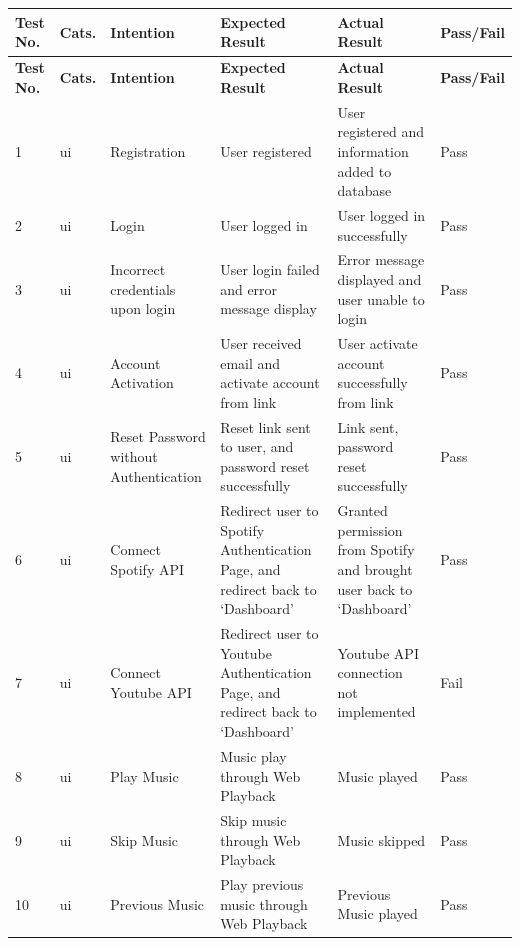 \newpage
\begin{landscape}
\section{}
\label{app:appendix-c}
\begin{longtable}{ |m{1cm}|m{1.5cm}|m{5cm}|m{6cm}|m{6cm}|m{2cm}| }
    \hline
    \rowcolor{lightgray}
    \textbf{Test No.} & \textbf{Cats.} & \textbf{Intention} & \textbf{Expected Result} & \textbf{Actual Result} & \textbf{Pass/Fail} \\
    \hline
    \endfirsthead

    \hline
    \rowcolor{lightgray}
    \textbf{Test No.} & \textbf{Cats.} & \textbf{Intention} & \textbf{Expected Result} & \textbf{Actual Result} & \textbf{Pass/Fail} \\
    \hline
    \endhead
    1 & \gls{ui} & Registration & User registered & User registered and information added to database & Pass \\
    \hline
    2 & \gls{ui} & Login & User logged in & User logged in successfully & Pass \\
    \hline
    3 & \gls{ui} & Incorrect credentials upon login & User login failed and error message display & Error message displayed and user unable to login & Pass \\
    \hline
    4 & \gls{ui} & Account Activation & User received email and activate account from link & User activate account successfully from link & Pass \\
    \hline
    5 & \gls{ui} & Reset Password without Authentication & Reset link sent to user, and password reset successfully & Link sent, password reset successfully & Pass \\
    \hline
    6 & \gls{ui} & Connect Spotify API & Redirect user to Spotify Authentication Page, and redirect back to `Dashboard' & Granted permission from Spotify and brought user back to `Dashboard' & Pass \\
    \hline
    7 & \gls{ui} & Connect Youtube API & Redirect user to Youtube Authentication Page, and redirect back to `Dashboard' & Youtube API connection not implemented & Fail \\
    \hline
    8 & \gls{ui} & Play Music & Music play through Web Playback & Music played & Pass \\
    \hline
    9 & \gls{ui} & Skip Music & Skip music through Web Playback & Music skipped & Pass \\
    \hline
    10 & \gls{ui} & Previous Music & Play previous music through Web Playback &  Previous Music played & Pass \\

\end{longtable}
\end{landscape}
